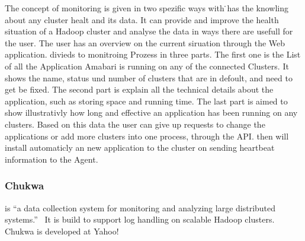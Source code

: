 The concept of monitoring is given in two spezific ways with \amb\. \amb has the knowling about any cluster healt and its data. It can provide and improve the health situation of a Hadoop cluster and analyse the data in ways there are usefull for the user. The user has an overview on the current siruation through the Web application. \amb divieds to monitroing Prozess in three parts. The first one is the List of all the Application Amabari is running on any of the connected Clusters. It shows the name, status und number of clusters that are in defoult, and need to get be fixed. The second part is explain all the technical details about the application, such as storing space and running time. The last part is aimed to show illustrativly how long and effective an application has been running on any clusters. Based on this data the user can give up requests to change the applications or add more clusters into one process, through the API. \amb then will install automaticly an new application to the cluster on sending heartbeat information to the \amb Agent. 

\subsubsection{Chukwa}
\chuklong is ``a data collection system for monitoring and analyzing large distributed systems.''~\cite{Boulona}
It is build to support log handling on scalable Hadoop clusters. Chukwa is developed at Yahoo!~\cite{Rabkin2008a}